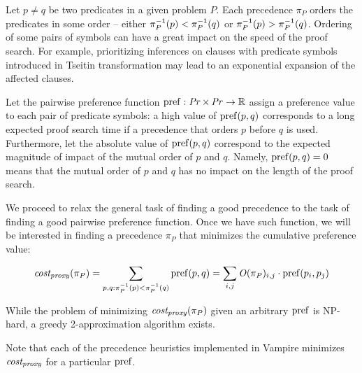 Let \(p \neq q\) be two predicates in a given \gls{problem} \(P\).
Each precedence \(\pi_P\) orders the predicates in some order --
either \(\pi_P^{-1}(p) < \pi_P^{-1}(q)\) or \(\pi_P^{-1}(p) > \pi_P^{-1}(q)\).
Ordering of some pairs of symbols can have a great impact on the speed of the proof search.
For example, prioritizing inferences on clauses with predicate symbols
introduced in Tseitin transformation
may lead to an exponential expansion of the affected clauses.

Let the pairwise preference
function \(\operatorname{pref} : \operatorname{\mathit{Pr}} \times \operatorname{\mathit{Pr}} \rightarrow \operatorname{\mathbb{R}}\)
assign a preference value to each pair of predicate symbols:
a high value of \(\operatorname{pref}(p, q)\) corresponds to a long expected proof search time
if a precedence that orders \(p\) before \(q\) is used.
Furthermore, let the absolute value of \(\operatorname{pref}(p, q)\)
correspond to the expected magnitude of impact of the mutual order of \(p\) and \(q\).
Namely, \(\operatorname{pref}(p, q) = 0\) means that the mutual order of \(p\) and \(q\)
has no impact on the length of the proof search.

We proceed to relax the general task of finding a good precedence
to the task of finding a good pairwise preference function.
Once we have such function,
we will be interested in finding a precedence \(\pi_P\) that minimizes the cumulative preference value:

\begin{align*}
\operatorname{\mathit{cost_{proxy}}}(\pi_P) = \sum_{p, q: \pi_P^{-1}(p) < \pi_P^{-1}(q)} \operatorname{pref}(p, q)
= \sum_{i, j} \operatorname{\mathit{O}}(\pi_P)_{i, j} \cdot \operatorname{pref}(p_i, p_j)
\end{align*}

While the problem of minimizing \(\operatorname{\mathit{cost_{proxy}}}(\pi_P)\) given an arbitrary \(\operatorname{pref}\) is NP-hard,
a greedy 2-approximation algorithm exists.\cite{Cohen2011}

Note that each of the precedence heuristics implemented in Vampire minimizes \(\operatorname{\mathit{cost_{proxy}}}\)
for a particular \(\operatorname{pref}\).

